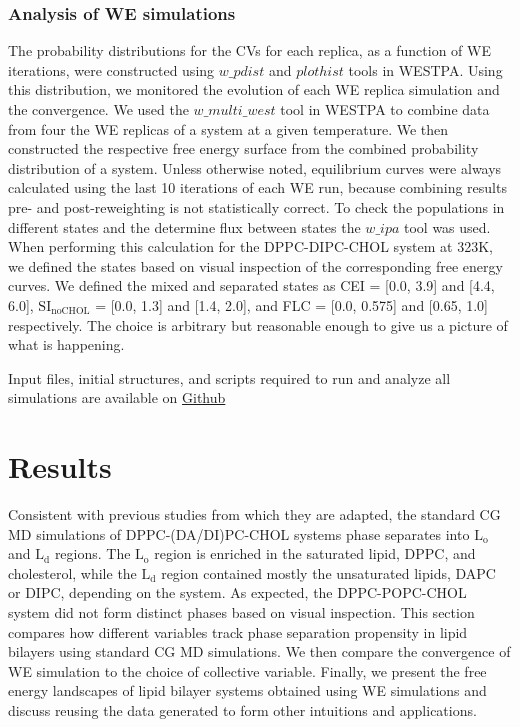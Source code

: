 \documentclass{biophys-new}
\begin{document}
\subsubsection*{Analysis of WE simulations}
The probability distributions for the CVs for each replica, as a function of WE iterations, were constructed using $w\_pdist$ and $plothist$ tools in WESTPA.
Using this distribution, we monitored the evolution of each WE replica simulation and the convergence.
We used the $w\_multi\_west$ tool in WESTPA to combine data from four the WE replicas of a system at a given temperature.
We then constructed the respective free energy surface from the combined probability distribution of a system. Unless otherwise noted, equilibrium curves were always calculated using the last 10 iterations of each WE run, because combining results pre- and post-reweighting is not statistically correct.
To check the populations in different states and the determine flux between states the $w\_ipa$ tool was used.
When performing this calculation for the DPPC-DIPC-CHOL system at 323K, we defined the states based on visual inspection of the corresponding free energy curves. We defined the mixed and separated states as CEI = [0.0, 3.9] and [4.4, 6.0], $\text{SI}_{\text{noCHOL}}$ = [0.0, 1.3] and [1.4, 2.0], and FLC = [0.0, 0.575] and [0.65, 1.0] respectively.
The choice is arbitrary but reasonable enough to give us a picture of what is happening. 

Input files, initial structures, and scripts required to run and analyze all simulations are available on \href{https://github.com/Poruthoor/CVs4PhaseSeparation}{Github}

\section*{Results}

Consistent with previous studies from which they are adapted, the standard CG MD simulations of DPPC-(DA/DI)PC-CHOL systems phase separates into $\text{L}_{\text{o}}$ and $\text{L}_{\text{d}}$ regions.
The $\text{L}_{\text{o}}$ region is enriched in the saturated lipid, DPPC, and cholesterol, while the  
$\text{L}_{\text{d}}$ region contained mostly the unsaturated lipids, DAPC or DIPC, depending on the system.
As expected, the DPPC-POPC-CHOL system did not form distinct phases based on visual inspection.
This section compares how different variables track phase separation propensity in lipid bilayers using standard CG MD simulations.
We then compare the convergence of WE simulation to the choice of collective variable.
Finally, we present the free energy landscapes of lipid bilayer systems obtained using WE simulations and discuss reusing the data generated to form other intuitions and applications.
\end{document}
